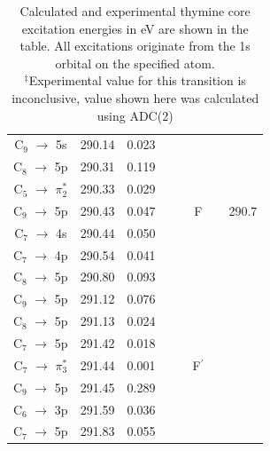 \documentclass[11.5pt]{article}
\begin{document}
\begin{table}
\begin{tabular}{c@{\hskip 0.22in}c@{\hskip 0.22in}c@{\hskip 0.52in}c@{\hskip 0.22in}c@{\hskip 0.22in}c}
 C$_9$ $\rightarrow$ 5s & 290.14 & 0.023& \multirow{7}{*}{\ \ \ \ F} & & \multirow{7}{*}{290.7}  \\
 C$_8$ $\rightarrow$ 5p & 290.31 & 0.119 \\
 C$_5$ $\rightarrow$ $\pi^*_2$ & 290.33 & 0.029 \\
 C$_9$ $\rightarrow$ 5p & 290.43 & 0.047 \\
 C$_7$ $\rightarrow$ 4s & 290.44 & 0.050 \\
 C$_7$ $\rightarrow$ 4p & 290.54 & 0.041 \\
 C$_8$ $\rightarrow$ 5p & 290.80 & 0.093 
 \vspace{2mm}\\
 C$_9$ $\rightarrow$ 5p & 291.12 & 0.076& \multirow{7}{*}{\ \ \ \ F$^{\prime}$}\\
 C$_8$ $\rightarrow$ 5p & 291.13 & 0.024 \\
 C$_7$ $\rightarrow$ 5p & 291.42 & 0.018 \\
 C$_7$ $\rightarrow$ $\pi^*_3$ & 291.44 & 0.001 \\
 C$_9$ $\rightarrow$ 5p & 291.45 & 0.289 \\
 C$_6$ $\rightarrow$ 3p & 291.59 & 0.036 \\
 C$_7$ $\rightarrow$ 5p & 291.83 & 0.055 \\
   \end{tabular}
      \caption{Calculated and experimental thymine core excitation energies in eV are shown in the table. All excitations originate from the 1s orbital on the specified atom. \\
  $^{\ddagger}$Experimental value for this transition is inconclusive, value shown here was calculated using ADC(2)}
  \label{figure:MOs}
  \end{table}
  \\ \\
\end{document}
